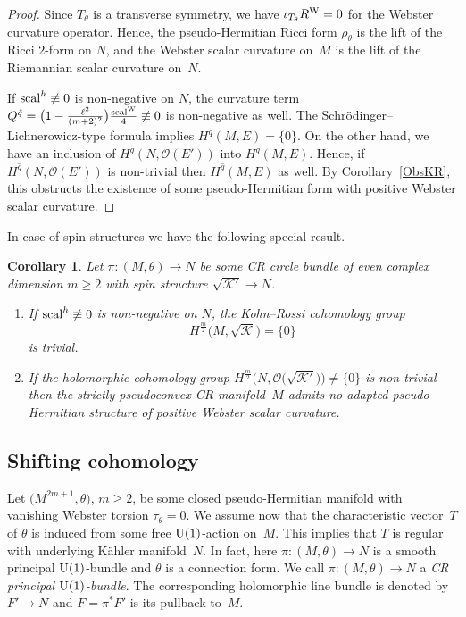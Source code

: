 \documentclass[10pt,a4paper]{amsart}
\numberwithin{equation}{section}
\newtheorem{Corollary}[Theorem]{Corollary}
\begin{document}
\begin{proof} Since $T_\theta$ is a transverse symmetry, we have $\iota_{T_\theta}R^{\rm W}=0$
for the Webster curvature operator. Hence, the pseudo-Hermitian Ricci form $\rho_\theta$ is the lift of the
Ricci $2$-form on $N$, and the Webster scalar curvature on~$M$ is the lift of the Riemannian scalar curvature on~$N$.

If ${\rm scal}^h\not\equiv0$ is non-negative on $N$, the curvature term $Q^{\hat{q}}=\big(1-\frac{\ell^2}{(m+2)^2}\big)\frac{{\rm scal}^{\rm W}}{4}\not\equiv 0$
is non-negative as well. The Schr\"odinger--Lichnerowicz-type formula implies $H^{\hat{q}}(M,E)=\{0\}$.
On the other hand, we have an inclusion of $H^{\hat{q}}(N,\mathcal{O}(E'))$ into $H^{\hat{q}}(M,E)$. Hence, if
$H^{\hat{q}}(N,\mathcal{O}(E'))$ is non-trivial then $H^{\hat{q}}(M,E)$ as well. By Corollary~\ref{ObsKR},
this obstructs the existence of some pseudo-Hermitian form with positive Webster scalar curvature.
\end{proof}

In case of spin structures we have the following special result.

\begin{Corollary} \label{cordem} Let $\pi\colon (M,\theta)\to N$ be some CR circle bundle of even complex dimension $m\geq 2$ with spin structure $\sqrt{\mathcal{K}'}\to N$.
\begin{enumerate}\itemsep=0pt
\item[$(a)$] If ${\rm scal}^h\not\equiv 0$ is non-negative on $N$, the Kohn--Rossi cohomology group
\[
H^{\frac{m}{2}}\big(M,\sqrt{\mathcal{K}}\big) = \{0\}
\]
is trivial.
\item[$(b)$]
If the holomorphic cohomology group $H^{\frac{m}{2}}\big(N,\mathcal{O}\big(\sqrt{\mathcal{K}'}\big)\big)\neq\{0\}$ is non-trivial then the strictly pseudoconvex CR manifold~$M$ admits no adapted pseudo-Hermitian structure of positive Webster scalar curvature.
\end{enumerate}
\end{Corollary}

\subsection{Shifting cohomology}

Let $\big(M^{2m+1},\theta\big)$, $m\geq 2$, be some closed pseudo-Hermitian manifold with vanishing Webster torsion $\tau_\theta=0$.
We assume now that the characteristic vector~$T$ of $\theta$
is induced from some free ${\rm U}(1)$-action on~$M$. This implies that $T$ is regular with underlying K\"ahler manifold~$N$.
In fact, here $\pi\colon (M,\theta)\to N$ is a smooth principal ${\rm U}(1)$-bundle and $\theta$ is a connection form.
We call $\pi\colon (M,\theta)\to N$ a {\em CR principal ${\rm U}(1)$-bundle}.
The corresponding holomorphic line bundle is denoted by $F'\to N$ and $F=\pi^*F'$ is its pullback to~$M$.
\end{document}
